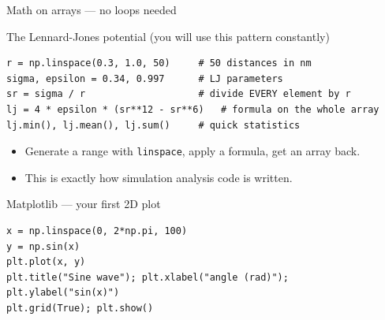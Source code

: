 \documentclass[aspectratio=169]{beamer}
\begin{document}
\begin{frame}[fragile]{Math on arrays --- no loops needed}
  \begin{block}{The Lennard-Jones potential (you will use this pattern constantly)}
    \begin{lstlisting}
r = np.linspace(0.3, 1.0, 50)     # 50 distances in nm
sigma, epsilon = 0.34, 0.997      # LJ parameters
sr = sigma / r                    # divide EVERY element by r
lj = 4 * epsilon * (sr**12 - sr**6)   # formula on the whole array
lj.min(), lj.mean(), lj.sum()     # quick statistics
    \end{lstlisting}
  \end{block}
  \begin{itemize}
    \item Generate a range with \texttt{linspace}, apply a formula, get an array back.
    \item This is exactly how simulation analysis code is written.
  \end{itemize}
\end{frame}

\begin{frame}[fragile]{Matplotlib --- your first 2D plot}
  \begin{center}
  \end{center}
  \begin{lstlisting}
x = np.linspace(0, 2*np.pi, 100)
y = np.sin(x)
plt.plot(x, y)
plt.title("Sine wave"); plt.xlabel("angle (rad)"); plt.ylabel("sin(x)")
plt.grid(True); plt.show()
  \end{lstlisting}
\end{frame}
\end{document}
